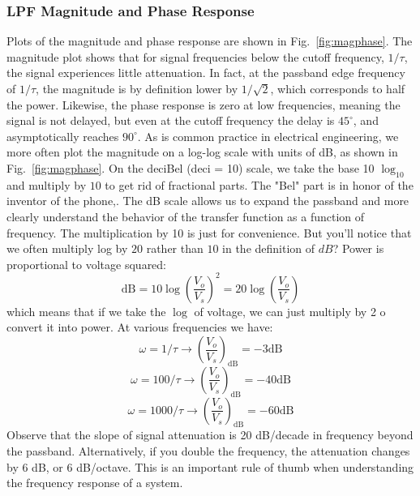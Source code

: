 \subsubsection{LPF Magnitude and Phase Response}
Plots of the magnitude and phase response are shown in Fig.~\ref{fig:magphase}.  The magnitude plot shows that for signal frequencies below the cutoff frequency, $1/\tau$, the signal experiences little attenuation.  In fact, at the passband edge frequency of $1/\tau$, the magnitude is by definition lower by $1/\sqrt{2}$, which corresponds to half the power.  Likewise, the phase response is zero at low frequencies, meaning the signal is not delayed, but even at the cutoff frequency the delay is $45^\circ$, and asymptotically reaches $90^\circ$.
As is common practice in electrical engineering, we more often plot the magnitude on a log-log scale with units of dB,  as shown in Fig.~\ref{fig:magphase}.  On the deciBel (deci = 10) scale, we take the base 10 $\log_{10}$ and multiply by $10$ to get rid of fractional parts.  The "Bel" part is in honor of the inventor of the phone,.  The dB scale allows us to expand the passband and more clearly understand the behavior of the transfer function as a function of frequency.  The multiplication by 10 is just for convenience.
But you'll notice that we often multiply log by $20$ rather than $10$ in the definition of $dB$?   Power is proportional to voltage squared:
    \begin{equation}
        \mathrm{dB} = 10 \log\left( \frac{V_o}{V_s} \right)^2 = 20 \log\left( \frac{V_o}{V_s} \right)
    \end{equation}
which means that if we take the $\log$ of voltage, we can just multiply by 2 o convert it into power.
At various frequencies we have:
    \begin{equation}
        \omega = 1/\tau \rightarrow \left( \frac{V_o}{V_s} \right)_{\mathrm{dB}} = -3 \mathrm{dB}
    \end{equation}
    \begin{equation}
        \omega = 100/\tau \rightarrow \left( \frac{V_o}{V_s} \right)_{\mathrm{dB}} = -40 \mathrm{dB}
    \end{equation}
    \begin{equation}
        \omega = 1000/\tau \rightarrow \left( \frac{V_o}{V_s} \right)_{\mathrm{dB}} = -60 \mathrm{dB}
    \end{equation}
Observe that the slope of signal attenuation is 20 dB/decade in frequency beyond the passband.   Alternatively, if you double the frequency, the attenuation changes by 6 dB, or 6 dB/octave.  This is an important rule of thumb when understanding the frequency response of a system.
